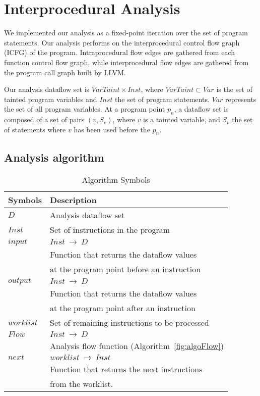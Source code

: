 \section{Interprocedural Analysis}\label{analysis}

We implemented our analysis as a fixed-point iteration
over the set of program statements. Our analysis performs
on the interprocedural control flow graph (ICFG) of the program.
Intraprocedural flow edges are gathered from each function
control flow graph, while interprocedural flow edges are
gathered from the program call graph built by LLVM. 

Our analysis dataflow set is $VarTaint \times Inst$,
where $VarTaint \subset Var$ is the set of tainted program
variables and $Inst$ the set of program statements. 
$Var$ represents the set of all program variables.
At a program point $p_n$, a dataflow set is composed
of a set of pairs $(v, S_v)$, where $v$ is a tainted
variable, and $S_v$ the set of statements where $v$
has been used before the $p_n$.
 
\subsection{Analysis algorithm} 

\begin{table}
\begin{tabular}{|l|l|}
\hline
\textbf{Symbols}	&	\textbf{Description}							\\ \hline
$D$					&	Analysis dataflow set 							\\ \hline
$Inst$				&	Set of instructions in the program 				\\ \hline
$input$				&	$Inst\ \rightarrow\ D$ 							\\
					&	Function that returns the dataflow values		\\
		    		&	at the program point before an instruction 		\\ 	\hline
$output$			&	$Inst\ \rightarrow\ D$ 							\\
					&	Function that returns the dataflow values		\\
		    		&	at the program point after an instruction 		\\ 	\hline
$worklist$			&	Set of remaining instructions to be processed 	\\ \hline
$Flow$				&	$Inst\ \rightarrow\ D$ 							\\
					&   Analysis flow function (Algorithm~\ref{fig:algoFlow}) 			\\ \hline
$next$				&	$worklist\ \rightarrow\ Inst$ 					\\
					& 	Function that returns the next instructions		\\
					&	from the worklist.								\\ \hline
\end{tabular}
\caption{Algorithm Symbols}\label{symTable}
\end{table}

